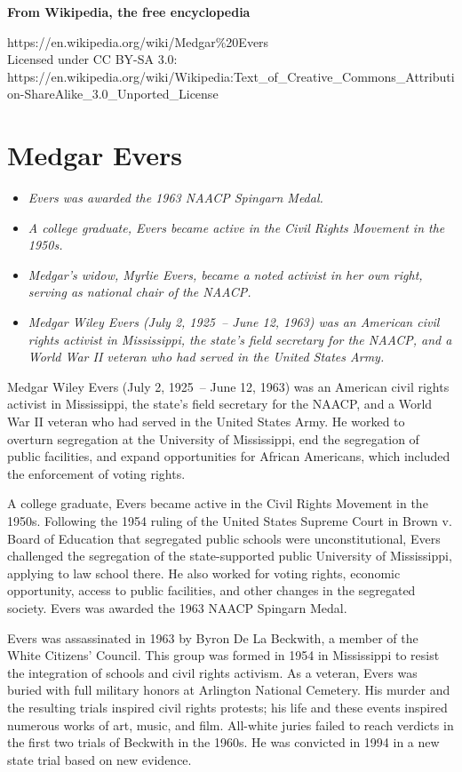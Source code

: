 \textbf{From Wikipedia, the free encyclopedia}

https://en.wikipedia.org/wiki/Medgar\%20Evers\\
Licensed under CC BY-SA 3.0:\\
https://en.wikipedia.org/wiki/Wikipedia:Text\_of\_Creative\_Commons\_Attribution-ShareAlike\_3.0\_Unported\_License

\section{Medgar Evers}\label{medgar-evers}

\begin{itemize}
\item
  \emph{Evers was awarded the 1963 NAACP Spingarn Medal.}
\item
  \emph{A college graduate, Evers became active in the Civil Rights
  Movement in the 1950s.}
\item
  \emph{Medgar's widow, Myrlie Evers, became a noted activist in her own
  right, serving as national chair of the NAACP.}
\item
  \emph{Medgar Wiley Evers (July 2, 1925~-- June 12, 1963) was an
  American civil rights activist in Mississippi, the state's field
  secretary for the NAACP, and a World War II veteran who had served in
  the United States Army.}
\end{itemize}

Medgar Wiley Evers (July 2, 1925~-- June 12, 1963) was an American civil
rights activist in Mississippi, the state's field secretary for the
NAACP, and a World War II veteran who had served in the United States
Army. He worked to overturn segregation at the University of
Mississippi, end the segregation of public facilities, and expand
opportunities for African Americans, which included the enforcement of
voting rights.

A college graduate, Evers became active in the Civil Rights Movement in
the 1950s. Following the 1954 ruling of the United States Supreme Court
in Brown v. Board of Education that segregated public schools were
unconstitutional, Evers challenged the segregation of the
state-supported public University of Mississippi, applying to law school
there. He also worked for voting rights, economic opportunity, access to
public facilities, and other changes in the segregated society. Evers
was awarded the 1963 NAACP Spingarn Medal.

Evers was assassinated in 1963 by Byron De La Beckwith, a member of the
White Citizens' Council. This group was formed in 1954 in Mississippi to
resist the integration of schools and civil rights activism. As a
veteran, Evers was buried with full military honors at Arlington
National Cemetery. His murder and the resulting trials inspired civil
rights protests; his life and these events inspired numerous works of
art, music, and film. All-white juries failed to reach verdicts in the
first two trials of Beckwith in the 1960s. He was convicted in 1994 in a
new state trial based on new evidence.


